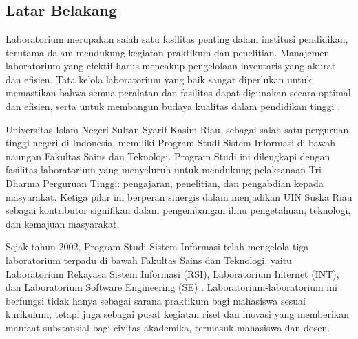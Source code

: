 %
%
%
%

\chapter{\babSatu}

\section{Latar Belakang}
Laboratorium merupakan salah satu fasilitas penting dalam institusi pendidikan, terutama dalam mendukung kegiatan praktikum dan penelitian. Manajemen laboratorium yang efektif harus mencakup pengelolaan inventaris yang akurat dan efisien. Tata kelola laboratorium yang baik sangat diperlukan untuk memastikan bahwa semua peralatan dan fasilitas dapat digunakan secara optimal dan efisien, serta untuk membangun budaya kualitas dalam pendidikan tinggi \cite{abrantes2020governance}.

Universitas Islam Negeri Sultan Syarif Kasim Riau, sebagai salah satu perguruan tinggi negeri di Indonesia, memiliki Program Studi Sistem Informasi di bawah naungan Fakultas Sains dan Teknologi. Program Studi ini dilengkapi dengan fasilitas laboratorium yang menyeluruh untuk mendukung pelaksanaan Tri Dharma Perguruan Tinggi: pengajaran, penelitian, dan pengabdian kepada masyarakat. Ketiga pilar ini berperan sinergis dalam menjadikan UIN Suska Riau sebagai kontributor signifikan dalam pengembangan ilmu pengetahuan, teknologi, dan kemajuan masyarakat.

Sejak tahun 2002, Program Studi Sistem Informasi telah mengelola tiga laboratorium terpadu di bawah Fakultas Sains dan Teknologi, yaitu Laboratorium Rekayasa Sistem Informasi (RSI), Laboratorium Internet (INT), dan Laboratorium Software Engineering (SE) \cite{lab-si-website}. Laboratorium-laboratorium ini berfungsi tidak hanya sebagai sarana praktikum bagi mahasiswa sesuai kurikulum, tetapi juga sebagai pusat kegiatan riset dan inovasi yang memberikan manfaat substansial bagi civitas akademika, termasuk mahasiswa dan dosen.

